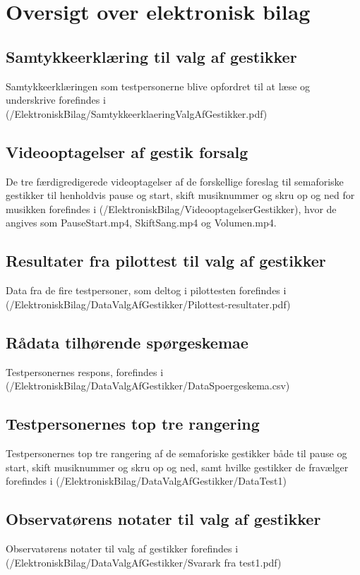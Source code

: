 \chapter{Oversigt over elektronisk bilag}
\label{app:OversigtOverElektroniskBilag}
%
%
\section{Samtykkeerklæring til valg af gestikker}
\label{app:SamtykkeerklaeringValgAfGestikker}
%
Samtykkeerklæringen som testpersonerne blive opfordret til at læse og underskrive forefindes i (/ElektroniskBilag/SamtykkeerklaeringValgAfGestikker.pdf)
%
\section{Videooptagelser af gestik forsalg}
\label{app:VideooptagelseGestikForslag}
%
De tre færdigredigerede videoptagelser af de forskellige foreslag til semaforiske gestikker til henholdvis pause og start, skift musiknummer og skru op og ned for musikken forefindes i (/ElektroniskBilag/VideooptagelserGestikker), hvor de angives som PauseStart.mp4, SkiftSang.mp4 og Volumen.mp4.
%
\section{Resultater fra pilottest til valg af gestikker}
\label{app:ResultaterPilottestValgAfGestikker}
%
Data fra de fire testpersoner, som deltog i pilottesten forefindes i \\
(/ElektroniskBilag/DataValgAfGestikker/Pilottest-resultater.pdf)
%
\section{Rådata tilhørende spørgeskemae}
\label{app:RaaDataSpoergeskema}
%
Testpersonernes respons, forefindes i (/ElektroniskBilag/DataValgAfGestikker/DataSpoergeskema.csv)
%
\section{Testpersonernes top tre rangering}
\label{app:TestpersonernesTopTre}
%
Testpersonernes top tre rangering af de semaforiske gestikker både til pause og start, skift musiknummer og skru op og ned, samt hvilke gestikker de fravælger forefindes i (/ElektroniskBilag/DataValgAfGestikker/DataTest1)
%
\section{Observatørens notater til valg af gestikker}
\label{app:NoterValgAfGestikker}
%
Observatørens notater til valg af gestikker forefindes i (/ElektroniskBilag/DataValgAfGestikker/Svarark fra test1.pdf)
%
